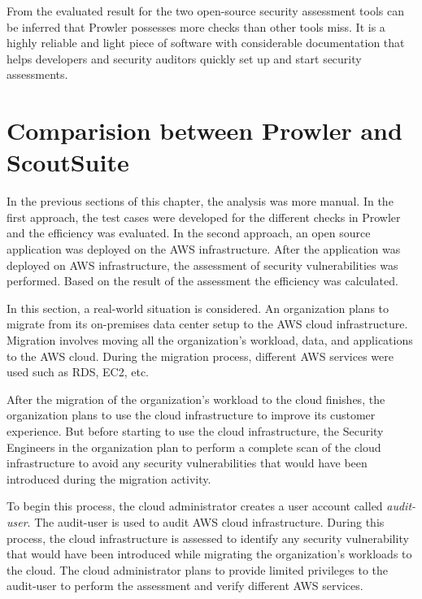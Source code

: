 \par From the evaluated result for the two open-source security assessment tools can be inferred that Prowler possesses more checks than other tools miss.
It is a highly reliable and light piece of software with considerable documentation that helps developers and security auditors quickly set up and start security assessments.

\section{Comparision between Prowler and ScoutSuite}

\par In the previous sections of this chapter, the analysis was more manual.
In the first approach, the test cases were developed for the different checks in Prowler and the efficiency was evaluated.
In the second approach, an open source application was
deployed
on the AWS infrastructure.
After the application
was deployed on AWS infrastructure, the assessment of
security vulnerabilities was performed.
Based on the result of the assessment the efficiency was calculated.
\\
\par In this section, a real-world situation is considered.
An organization plans to migrate from its on-premises data center setup to the AWS cloud infrastructure.
Migration involves moving all the organization’s workload, data, and applications to the AWS cloud.
During the migration process, different AWS services were
used such as RDS, EC2, etc.
\\
\par After the migration of the organization’s workload to the cloud finishes, the organization plans to use the cloud infrastructure to improve its customer experience.
But before starting to use the cloud infrastructure, the Security Engineers in the organization plan to perform a complete scan of the cloud infrastructure to avoid any security vulnerabilities that would have been introduced during the migration activity.
\\
\par To begin this process, the cloud administrator creates a user account called \textit{audit-user}.
The audit-user is used to audit AWS cloud infrastructure.
During this process, the cloud infrastructure is assessed to identify any security vulnerability that would have been introduced while migrating the organization’s workloads to the cloud.
The cloud administrator plans to provide limited privileges to the audit-user to perform the assessment and verify different AWS services.
